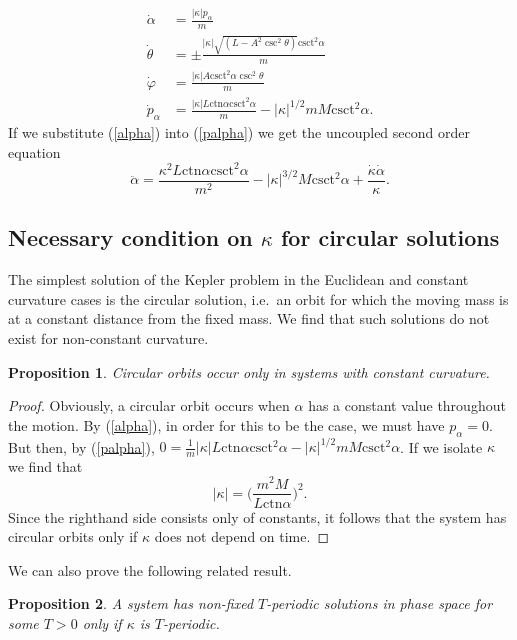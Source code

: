 \documentclass[12pt]{amsart}
\newtheorem{proposition}{Proposition}
\theoremstyle{definition}
\newcommand {\ctn} {\text{ctn}}
\newcommand {\csct} {\text{csct}}
\begin{document}
{\begin{align}
\dot{\alpha}&=\frac{|\kappa|p_\alpha}{m}\label{alpha}\\
\dot{\theta}&=\pm\frac{|\kappa|\sqrt{(L-A^2\csc^2{\theta})}\csct^2{\alpha}}{m}\label{theta}\\
\dot{\varphi}&=\frac{|\kappa|A\csct^2{\alpha}\csc^2{\theta}}{m}\label{phi}\\
\dot{p}_\alpha&=\frac{|\kappa|L\ctn{\alpha}\csct^2{\alpha}}{m}-|\kappa|^{1/2}mM\csct^2{\alpha}.\label{palpha}
\end{align}
If we substitute (\ref{alpha}) into (\ref{palpha}) we get the uncoupled second order equation \begin{equation}
\ddot{\alpha}=\frac{\kappa^2L\ctn{\alpha}\csct^2{\alpha}}{m^2}-|\kappa|^{3/2}M\csct^2{\alpha}+\frac{\dot{\kappa}\dot{\alpha}}{\kappa}.\end{equation}

\subsection{Necessary condition on $\kappa$ for circular solutions}

The simplest solution of the Kepler problem in the Euclidean and constant curvature cases is the circular solution, i.e.\ an orbit for which the moving mass is at a constant distance from the fixed mass. We find that such solutions do not exist for non-constant curvature.


\begin{proposition}Circular orbits occur only in systems with constant curvature.\end{proposition}


\begin{proof}
Obviously, a circular orbit occurs when $\alpha$ has a constant value throughout the motion. By (\ref{alpha}), in order for this to be the case, we must have $p_\alpha=0$. But then, by (\ref{palpha}), $0=\frac{1}{m}|\kappa|L\ctn{\alpha}\csct^2{\alpha} - |\kappa|^{1/2}mM\csct^2{\alpha}$. If we isolate $\kappa$ we find that $$|\kappa|=\biggl(\frac{m^2M}{L\ctn{\alpha} }\biggr)^2.$$
Since the righthand  side consists only of constants, it follows that the system has circular orbits only if $\kappa$ does not depend on time.\end{proof}

We can also prove the following related result.
\begin{proposition}A system has non-fixed $T$-periodic solutions in phase space for some $T>0$ only if $\kappa$ is $T$-periodic.\end{proposition}
\smallskip

}
\end{document}
